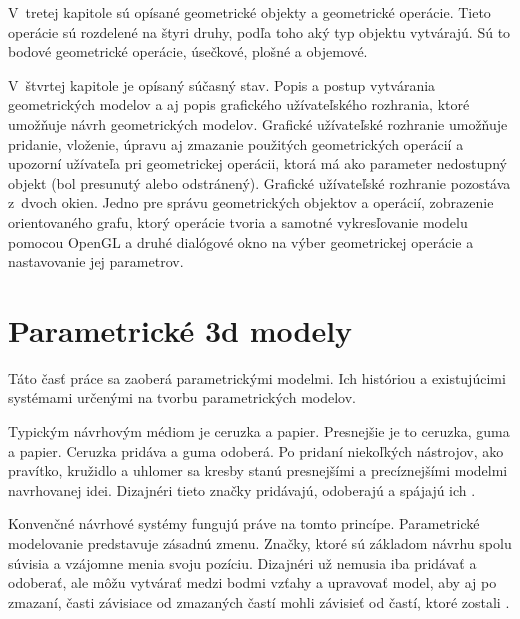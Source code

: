 V~tretej kapitole sú opísané geometrické objekty a geometrické operácie. Tieto operácie sú rozdelené na štyri druhy, podľa toho aký typ objektu vytvárajú. Sú to bodové geometrické operácie, úsečkové, plošné a objemové. 


V~štvrtej kapitole je opísaný súčasný stav. Popis a postup vytvárania geometrických modelov a aj popis grafického užívateľského rozhrania, ktoré umožňuje návrh geometrických modelov. Grafické užívateľské rozhranie umožňuje pridanie, vloženie, úpravu aj zmazanie použitých geometrických operácií a upozorní užívateľa pri geometrickej operácii, ktorá má ako parameter nedostupný objekt (bol presunutý alebo odstránený). Grafické užívateľské rozhranie pozostáva z~dvoch okien. Jedno pre správu geometrických objektov a operácií, zobrazenie orientovaného grafu, ktorý operácie tvoria a samotné vykresľovanie modelu pomocou OpenGL a druhé dialógové okno na výber geometrickej operácie a nastavovanie jej parametrov. 

\chapter{Parametrické 3d modely}
Táto časť práce sa zaoberá parametrickými modelmi. Ich históriou a existujúcimi systémami určenými na tvorbu parametrických modelov.


Typickým návrhovým médiom je ceruzka a papier. Presnejšie je to ceruzka, guma a papier. Ceruzka pridáva a guma odoberá. Po pridaní niekoľkých nástrojov, ako pravítko, kružidlo a uhlomer sa kresby stanú presnejšími a precíznejšími modelmi navrhovanej idei. Dizajnéri tieto značky pridávajú, odoberajú a spájajú ich  \cite{woodbury2010elements}.

Konvenčné návrhové systémy fungujú práve na tomto princípe. Parametrické modelovanie predstavuje zásadnú zmenu. Značky, ktoré sú základom návrhu spolu súvisia a vzájomne menia svoju pozíciu. Dizajnéri už nemusia iba pridávať a odoberať, ale môžu vytvárať medzi bodmi vzťahy a upravovať model, aby aj po zmazaní, časti závisiace od zmazaných častí mohli závisieť od častí, ktoré zostali \cite{woodbury2010elements}. 



